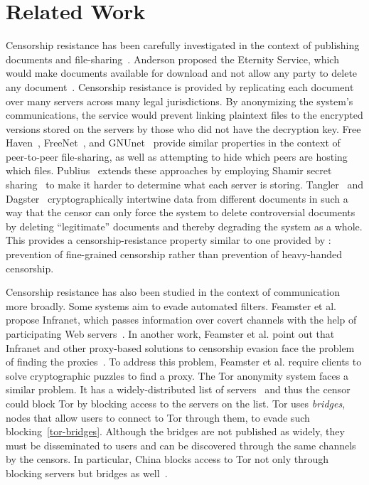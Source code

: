 \section{Related Work}

Censorship resistance has been carefully investigated in the context of
publishing documents and
file-sharing~\cite{eternity,freehaven,freenet,gnunet-esed,publius,tangler,dagster}.
Anderson proposed the Eternity Service, which would make documents
available for download and not allow any party to delete any
document~\cite{eternity}. Censorship resistance is provided by
replicating each document over many servers across many legal
jurisdictions. By anonymizing the system's communications, the service
would prevent linking plaintext files to the encrypted versions stored
on the servers by those who did not have the decryption key. Free
Haven~\cite{freehaven}, FreeNet~\cite{freenet}, and
GNUnet~\cite{gnunet-esed} provide similar properties in the context of
peer-to-peer file-sharing, as well as attempting to hide which peers are
hosting which files. Publius~\cite{publius} extends these approaches by
employing Shamir secret sharing~\cite{shamir} to make it harder to
determine what each server is storing. Tangler~\cite{tangler} and
Dagster~\cite{dagster} cryptographically intertwine data from different
documents in such a way that the censor can only force the system to
delete controversial documents by deleting ``legitimate'' documents and
thereby degrading the system as a whole. This provides a
censorship-resistance property similar to one provided by \hoot:
prevention of fine-grained censorship rather than prevention of
heavy-handed censorship.

Censorship resistance has also been studied in the context of
communication more broadly. Some systems aim to evade automated
filters. Feamster et al. propose Infranet, which passes information over
covert channels with the help of participating Web
servers~\cite{infranet}. In another work, Feamster et al. point out that
Infranet and other proxy-based solutions to censorship evasion face the
problem of finding the proxies~\cite{feamster03proxy}. To address this
problem, Feamster et al. require clients to solve cryptographic puzzles
to find a proxy. The Tor anonymity system faces a similar problem. It
has a widely-distributed list of servers~\cite{tor} and thus the censor
could block Tor by blocking access to the servers on the list. Tor uses
{\em bridges}, nodes that allow users to connect to Tor through them, to
evade such blocking~\ref{tor-bridges}. Although the bridges are not
published as widely, they must be disseminated to users and can be
discovered through the same channels by the censors. In particular,
China blocks access to Tor not only through blocking servers but bridges
as well~\cite{tor-china}.

